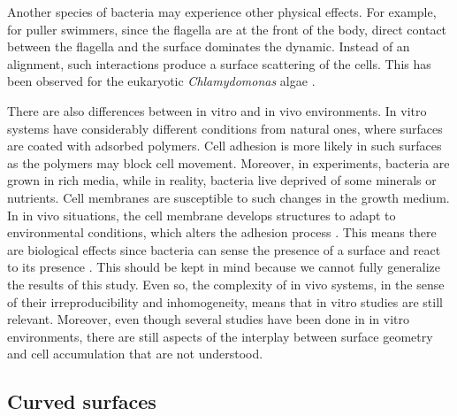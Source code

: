 Another species of bacteria may experience other physical effects. For example, for puller swimmers, since the flagella are at the front of the body, direct contact between the flagella and the surface dominates the dynamic. Instead of an alignment, such interactions produce a surface scattering of the cells. This has been observed for the eukaryotic \textit{Chlamydomonas} algae \cite{Kantsler2013CiliaryEukaryotes}. 

There are also differences between in vitro and in vivo environments. In vitro systems have considerably different conditions from natural ones, where surfaces are coated with adsorbed polymers. Cell adhesion is more likely in such surfaces as the polymers may block cell movement. Moreover, in experiments, bacteria are grown in rich media, while in reality, bacteria live deprived of some minerals or nutrients. Cell membranes are susceptible to such changes in the growth medium. In in vivo situations, the cell membrane develops structures to adapt to environmental conditions, which alters the adhesion process \cite{Brown1985TheInfections.}. This means there are biological effects since bacteria can sense the presence of a surface and react to its presence \cite{Kimkes2019HowContact,Laventie2020SurfaceBacteria}. This should be kept in mind because we cannot fully generalize the results of this study. Even so, the complexity of in vivo systems, in the sense of their irreproducibility and inhomogeneity, means that in vitro studies are still relevant. Moreover, even though several studies have been done in in vitro environments, there are still aspects of the interplay between surface geometry and cell accumulation that are not understood.

\subsection{Curved surfaces}


